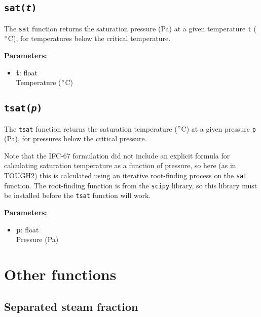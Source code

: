 \begin{snugshade}
\subsection{\texttt{sat(\emph{t})}}
\end{snugshade}
\label{sec:t2thermo:sat}

The \texttt{sat} function returns the saturation pressure (Pa) at a given temperature \texttt{t} ($\degree$C), for temperatures below the critical temperature.

\textbf{Parameters:}
\begin{itemize}
\item \textbf{t}: float\\
  Temperature ($\degree$C)
\end{itemize}

\begin{snugshade}
\subsection{\texttt{tsat(\emph{p})}}
\end{snugshade}
\label{sec:t2thermo:tsat}

The \texttt{tsat} function returns the saturation temperature ($\degree$C) at a given pressure \texttt{p} (Pa), for pressures below the critical pressure.

Note that the IFC-67 formulation did not include an explicit formula for calculating saturation temperature as a function of pressure, so here (as in TOUGH2) this is calculated using an iterative root-finding process on the \texttt{sat} function.  The root-finding function is from the \texttt{scipy} library, so this library must be installed before the \texttt{tsat} function will work.

\textbf{Parameters:}
\begin{itemize}
\item \textbf{p}: float\\
  Pressure (Pa)
\end{itemize}

\section{Other functions}

\subsection{Separated steam fraction}

